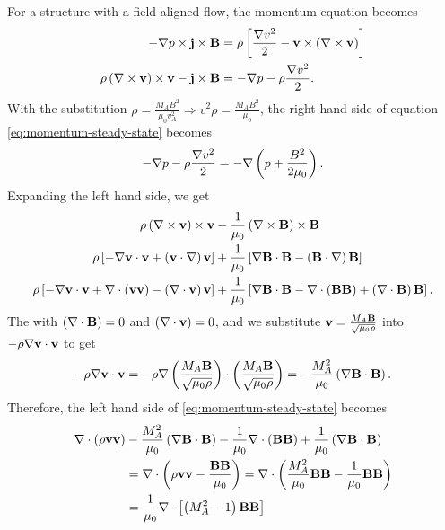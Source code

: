 For a structure with a field-aligned flow, the momentum equation becomes
\begin{equation}
    \begin{split}
        -\nabla p \times \mathbf{j}\times\mathbf{B} &= \rho\left[ \frac{\nabla v^2}{2} - \mathbf{v}\times\left( \nabla \times\mathbf{v} \right) \right] \\
        \rho\left( \nabla \times\mathbf{v} \right)\times\mathbf{v} - \mathbf{j}\times\mathbf{B} &= -\nabla p -\rho\frac{\nabla v^2}{2}. \\
    \end{split}
    \label{eq:momentum-steady-state}
\end{equation}
With the substitution $\rho=\frac{M_A B^2}{\mu_0 v_A^2} \Rightarrow v^2\rho = \frac{M_A B^2}{\mu_0}$, the right hand side of equation \ref{eq:momentum-steady-state} becomes
\begin{equation}
    -\nabla p -\rho\frac{\nabla v^2}{2} = -\nabla\left( p + \frac{B^2}{2\mu_0} \right).
    \label{eq:momentum-RHS}
\end{equation}
Expanding the left hand side, we get
\begin{equation}
    \begin{split}
        \rho\left( \nabla \times\mathbf{v} \right)\times\mathbf{v} &- \frac{1}{\mu_0}\left( \nabla \times\mathbf{B} \right)\times\mathbf{B} \\
        \rho \left[ -\nabla\mathbf{v}\cdot\mathbf{v} + \left( \mathbf{v}\cdot\nabla \right)\mathbf{v} \right] &+ \frac{1}{\mu_0}\left[ \nabla\mathbf{B}\cdot\mathbf{B} - \left( \mathbf{B}\cdot\nabla \right)\mathbf{B} \right] \\
        \rho \left[ -\nabla\mathbf{v}\cdot\mathbf{v} + \nabla \cdot\left( \mathbf{v}\mathbf{v} \right) -\left( \nabla \cdot\mathbf{v} \right)\mathbf{v} \right] &+ \frac{1}{\mu_0}\left[ \nabla\mathbf{B}\cdot\mathbf{B} - \nabla \cdot\left( \mathbf{B}\mathbf{B} \right) + \left( \nabla \cdot\mathbf{B} \right) \mathbf{B} \right]. \\
    \end{split}
\end{equation}
The with $\left( \nabla \cdot\mathbf{B} \right)=0$ and $\left( \nabla \cdot\mathbf{v} \right)=0$, and we substitute $\mathbf{v}=\frac{M_A \mathbf{B}}{\sqrt{\mu_0\rho}}$ into $-\rho\nabla\mathbf{v}\cdot\mathbf{v}$ to get
\begin{equation}
    -\rho\nabla\mathbf{v}\cdot\mathbf{v} = -\rho\nabla\left( \frac{M_A \mathbf{B}}{\sqrt{\mu_0\rho}} \right)\cdot\left( \frac{M_A \mathbf{B}}{\sqrt{\mu_0\rho}} \right) = -\frac{M_A^2}{\mu_0}\left( \nabla\mathbf{B}\cdot\mathbf{B} \right).
\end{equation}
Therefore, the left hand side of \ref{eq:momentum-steady-state} becomes
\begin{equation}
    \begin{split}
        \nabla \cdot\left( \rho\mathbf{v}\mathbf{v} \right) &- \frac{M_A^2}{\mu_0}\left( \nabla\mathbf{B}\cdot\mathbf{B} \right)  - \frac{1}{\mu_0}\nabla \cdot\left( \mathbf{B}\mathbf{B} \right) + \frac{1}{\mu_0}\left( \nabla\mathbf{B}\cdot\mathbf{B} \right)\\
        &= \nabla \cdot\left( \rho\mathbf{v}\mathbf{v} - \frac{\mathbf{B}\mathbf{B}}{\mu_0} \right)
        = \nabla \cdot\left( \frac{M_A^2}{\mu_0}\mathbf{B}\mathbf{B} - \frac{1}{\mu_0}\mathbf{B}\mathbf{B} \right) \\
        &= \frac{1}{\mu_0}\nabla \cdot\left[ \left( M_A^2-1 \right)\mathbf{B}\mathbf{B} \right] \\
    \end{split}
    \label{eq:momentum-LHS}
\end{equation}

